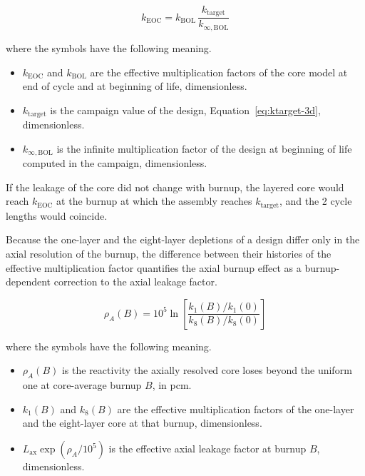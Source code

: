 \begin{equation}
k_\mathrm{EOC} = k_\mathrm{BOL}\,\frac{k_\mathrm{target}}{k_{\infty,\mathrm{BOL}}}
\label{eq:axial-eoc}
\end{equation}

\noindent where the symbols have the following meaning.

\begin{itemize}
  \item $k_\mathrm{EOC}$ and $k_\mathrm{BOL}$ are the effective
        multiplication factors of the core model at end of cycle and at
        beginning of life, dimensionless.
  \item $k_\mathrm{target}$ is the campaign value of the design,
        Equation~\eqref{eq:ktarget-3d}, dimensionless.
  \item $k_{\infty,\mathrm{BOL}}$ is the infinite multiplication factor of
        the design at beginning of life computed in the campaign,
        dimensionless.
\end{itemize}

If the leakage of the core
did not change with burnup, the layered core would reach
$k_\mathrm{EOC}$ at the burnup at which the assembly reaches
$k_\mathrm{target}$, and the 2 cycle lengths would coincide.

Because the one-layer and the eight-layer depletions of a design differ
only in the axial resolution of the burnup, the difference between
their histories of the effective multiplication factor quantifies the
axial burnup effect as a burnup-dependent correction to the axial
leakage factor.

\begin{equation}
\rho_A(B) = 10^5 \ln\!\left[\frac{k_1(B)/k_1(0)}{k_8(B)/k_8(0)}\right]
\label{eq:axial-rhoA}
\end{equation}

\noindent where the symbols have the following meaning.

\begin{itemize}
  \item $\rho_A(B)$ is the reactivity the axially resolved core loses
        beyond the uniform one at core-average burnup $B$, in pcm.
  \item $k_1(B)$ and $k_8(B)$ are the effective multiplication factors of
        the one-layer and the eight-layer core at that burnup,
        dimensionless.
  \item $L_\mathrm{ax}\exp(\rho_A/10^5)$ is the effective axial leakage
        factor at burnup $B$, dimensionless.
\end{itemize}

